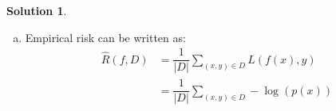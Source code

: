 \documentclass{article}
\theoremstyle{definition}
\newtheorem*{solution}{Solution}
\begin{document}
\begin{solution}
\begin{enumerate}[1.]
\begin{enumerate}[(a)]
\begin{proof}
                        As above, we can also express the constant term in a product form, giving us  the expression for $p(\bm{x})$:
                        
						\begin{equation*}
                        	\begin{split}
								p(\bm{x}) & = \prod_{i=1}^{d} \frac{1}{(2\pi \sigma_{ii}^2)^{1/2} } \prod_{i=1}^{d} \exp (-\frac{1}{2 \sigma_{ii}^2}(x_i - \mu)^2) \\
                                & = \prod_{i=1}^{d} \frac{1}{(2\pi \sigma_{ii}^2)^{1/2} } \exp (-\frac{1}{2 \sigma_{ii}^2}(x_i - \mu)^2) 
                            \end{split}
						\end{equation*}
                        
                        	Note that $\dfrac{1}{(2\pi \sigma_{ii}^2)^{1/2} } \exp (\dfrac{1}{2 \sigma_{ii}^2}(x_i - \mu)^2)$ is a Gaussian with parameters $\mathcal{N}(\mu, \sigma_{ii})$.

						Thus, we have:

						\begin{equation*}
							p(\bm{x}) = \prod_{i =1}^{d} \mathcal{N}(\mu, \sigma_{ii})
						\end{equation*}
                    
                    Therefore, the diagonal Gaussian density function is equal to the product of the individual components' density functions, and the individual components are independent.
                    \end{proof}
                    
                    
            	\item Empirical risk can be written as:
                	\begin{equation*}
                    	\begin{split}
							\hat{R}(f, D) & = \dfrac{1}{|D|} \sum_{(x, y) \in D} L(f(x), y) \\
                            & = \dfrac{1}{|D|} \sum_{(x, y) \in D} -\log(p(x))
						\end{split}
                    \end{equation*}
                    

\end{enumerate}
\end{enumerate}
\end{solution}
\end{document}
